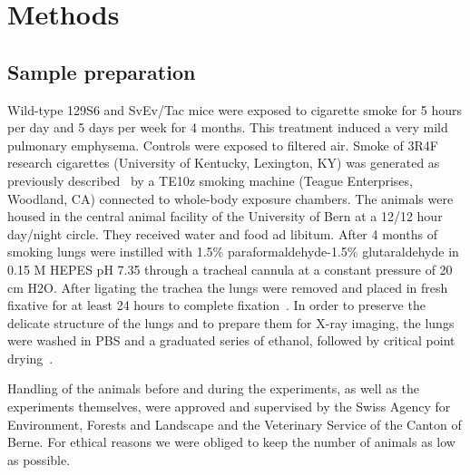 \documentclass[preprint,12pt]{elsarticle}
\begin{document}
\section*{Methods}\label{sec:methods}
\subsection*{Sample preparation}
Wild-type 129S6 and SvEv/Tac mice \cite{Dai_2015} were exposed to cigarette smoke for 5 hours per day and 5 days per week for 4 months. This treatment induced a very mild pulmonary emphysema. Controls were exposed to filtered air. Smoke of 3R4F research cigarettes (University of Kentucky, Lexington, KY) was generated as previously described~\cite{Cremona_2013} by a TE10z smoking machine (Teague Enterprises, Woodland, CA) connected to whole-body exposure chambers. The animals were housed in the central animal facility of the University of Bern at a 12/12 hour day/night circle. They received water and food ad libitum. After 4 months of smoking lungs were instilled with 1.5\% paraformaldehyde-1.5\% glutaraldehyde in 0.15 M HEPES pH 7.35 through a tracheal cannula at a constant pressure of 20 cm H2O. After ligating the trachea the lungs were removed and placed in fresh fixative for at least 24 hours to complete fixation~\cite{Cremona_2013}. In order to preserve the delicate structure of the lungs and to prepare them for X-ray imaging, the lungs were washed in PBS and a graduated series of ethanol, followed by critical point drying~\cite{Barr__2016,Kaeslin_2005}.

Handling of the animals before and during the experiments, as well as the experiments themselves, were approved and supervised by the Swiss Agency for Environment, Forests and Landscape and the Veterinary Service of the Canton of Berne. For ethical reasons we were obliged to keep the number of animals as low as possible.
\end{document}
